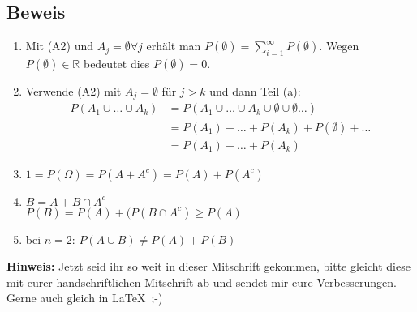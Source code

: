 \subsection{Beweis}
\begin{enumerate}
	\item Mit (A2) und $A_j=\emptyset \forall j$ erhält man $P(\emptyset) = \sum_{i=1}^\infty P(\emptyset)$. 
	Wegen $P(\emptyset) \in \mathbb{R}$ bedeutet dies $P(\emptyset) = 0$.
	\item Verwende (A2) mit $A_j=\emptyset$ für $j>k$ und dann Teil (a):
	\begin{align*}
		P(A_1 \cup \ldots \cup A_k) & =
		P(A_1 \cup \ldots \cup A_k \cup \emptyset \cup \emptyset \ldots) \\ & = 
		P(A_1) + \ldots + P(A_k) + P(\emptyset) + \ldots \\ & =
		P(A_1) + \ldots + P(A_k)
	\end{align*}
	\item $1 = P(\Omega) = P(A + A^c) = P(A) + P(A^c)$
	\item $B = A + B \cap A^c$\\
	$P(B) = P(A) + (P(B\cap A^c) \geq P(A)$
	\item bei $n=2$: $P(A \cup B) \neq P(A) + P(B)$
\end{enumerate}


\textbf{Hinweis:} Jetzt seid ihr so weit in dieser Mitschrift gekommen, bitte gleicht diese mit eurer handschriftlichen Mitschrift ab und sendet mir eure Verbesserungen. Gerne auch gleich in \LaTeX\ ;-)
